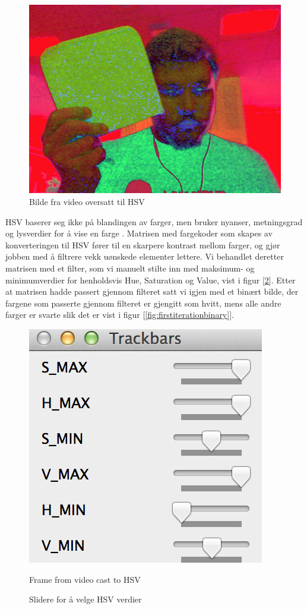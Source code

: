 \begin{figure}[h!]
	\centering
	\includegraphics[scale=0.45]{img/first-hsv.jpg}
	\caption[Første iterasjon HSV bilde]{Bilde fra video oversatt til HSV}
	\label{fig:firstiterationhsv}
\end{figure}

HSV baserer seg ikke på blandingen av farger, men bruker nyanser, metningsgrad og lysverdier for å vise en farge . Matrisen med fargekoder som skapes av konverteringen til HSV fører til en skarpere kontrast mellom farger, og gjør jobben med å filtrere vekk uønskede elementer lettere. Vi behandlet deretter matrisen med et filter, som vi manuelt stilte inn med maksimum- og minimumverdier for henholdsvis Hue, Saturation og Value, vist i figur [\ref{fig:sliders}]. Etter at matrisen hadde passert gjennom filteret satt vi igjen med et binært bilde, der fargene som passerte gjennom filteret er gjengitt som hvitt, mens alle andre farger er svarte slik det er vist i figur [\ref{fig:firstiterationbinary}].

\begin{figure}[h!]
	\centering
	\includegraphics[scale=0.45]{img/sliders.jpg}
	\caption[First iteration HSV image]{Frame from video cast to HSV}
	\caption{Slidere for å velge HSV verdier}
	\label{fig:sliders}
\end{figure}

